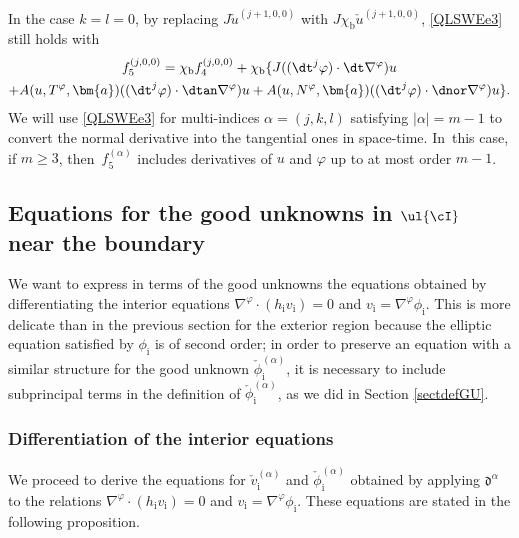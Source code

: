 In the case $k=l=0$, by replacing $J\check{u}^{(j+1,0,0)}$ with $J\chi_\mathrm{b}\check{u}^{(j+1,0,0)}$, \eqref{QLSWEe3} still holds with
\begin{multline*}
f_5^{(j,0,0)}
= \chi_\mathrm{b}f_4^{(j,0,0)} + \chi_\mathrm{b} \{ J((\dt^j\varphi)\cdot\dt\nabla^\varphi)u \\
+ A(u,T^\varphi,\bm{a})((\dt^j\varphi)\cdot\dtan\nabla^\varphi)u
+ A(u,N^\varphi,\bm{a})((\dt^j\varphi)\cdot\dnor\nabla^\varphi)u \}.
\end{multline*}
We will use \eqref{QLSWEe3} for multi-indices $\alpha=(j,k,l)$ satisfying $|\alpha|=m-1$ to convert the normal derivative into the tangential ones in space-time. In~this case, if $m\geq3$, then~$f_5^{(\alpha)}$ includes derivatives of $u$ and $\varphi$ up to at most order $m-1$.

\Changelback

\subsection{Equations for the good unknowns in $\ul{\cI}$ near the boundary}\label{sectnearbdry}
We want to express in terms of the good unknowns the equations obtained by differentiating the interior equations $\nabla^\varphi\cdot(h_\mathrm{i}v_\mathrm{i})=0$
and $v_\mathrm{i}=\nabla^\varphi\phi_\mathrm{i}$.
This is more delicate than in the previous section for the exterior region because the elliptic equation satisfied by $\phi_\mathrm{i}$ is of second order;
in order to preserve an equation with a similar structure for the good unknown $\check\phi_\mathrm{i}^{(\alpha)}$,
it is necessary to include subprincipal terms in the definition of $\check\phi_\mathrm{i}^{(\alpha)}$, as we did in Section \ref{sectdefGU}.

\subsubsection{Differentiation of the interior equations}
We proceed to derive the equations for $\check{v}_\mathrm{i}^{(\alpha)}$ and $\check{\phi}_\mathrm{i}^{(\alpha)}$
obtained by applying $\mathfrak{d}^\alpha$ to the relations $\nabla^\varphi\cdot (h_\mathrm{i}v_\mathrm{i})=0$ and $v_\mathrm{i}=\nabla^\varphi \phi_\mathrm{i}$.
These equations are stated in the following proposition.

